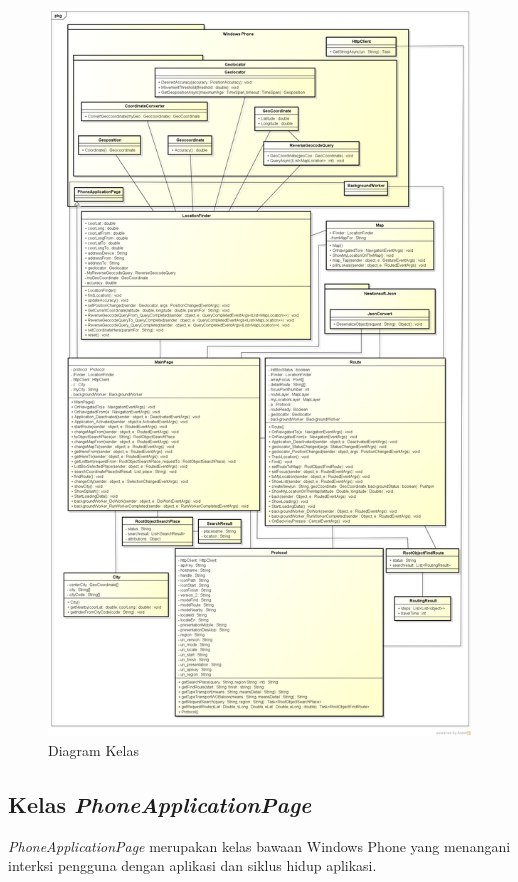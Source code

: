 \begin{figure}[h]
	\centering
		\includegraphics[scale=0.2]{Gambar/useCase_dan_Class/class4}
	\caption{Diagram Kelas}
	\label{fig:kelas}
\end{figure}


\subsection{Kelas \textit{PhoneApplicationPage}}
\label{lab:Kelas PhoneApplicationPage}
\hspace{0.5cm} \textit{PhoneApplicationPage} merupakan kelas bawaan Windows Phone yang menangani interksi pengguna dengan aplikasi dan siklus hidup aplikasi.

